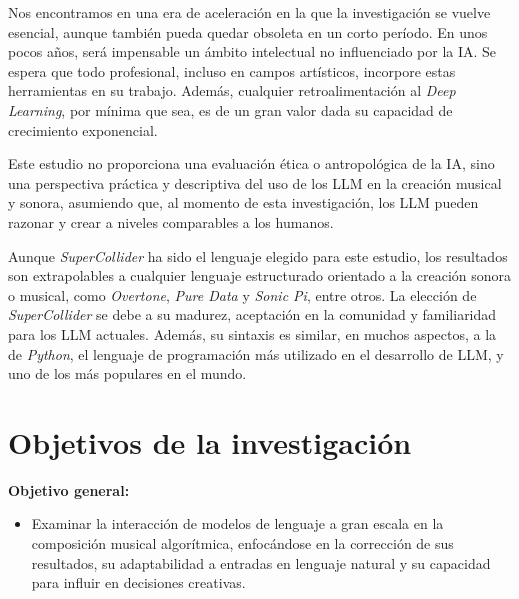 Nos encontramos en una era de aceleración en la que la investigación se vuelve esencial, aunque también pueda quedar obsoleta en un corto período. En unos pocos años, será impensable un ámbito intelectual no influenciado por la IA. Se espera que todo profesional, incluso en campos artísticos, incorpore estas herramientas en su trabajo. Además, cualquier retroalimentación al \textit{Deep Learning}, por mínima que sea, es de un gran valor dada su capacidad de crecimiento exponencial.

Este estudio no proporciona una evaluación ética o antropológica de la IA, sino una perspectiva práctica y descriptiva del uso de los LLM en la creación musical y sonora, asumiendo que, al momento de esta investigación, los LLM pueden razonar y crear a niveles comparables a los humanos.

Aunque \textit{SuperCollider} ha sido el lenguaje elegido para este estudio, los resultados son extrapolables a cualquier lenguaje estructurado orientado a la creación sonora o musical, como \textit{Overtone}, \textit{Pure Data} y \textit{Sonic Pi}, entre otros. La elección de \textit{SuperCollider} se debe a su madurez, aceptación en la comunidad y familiaridad para los LLM actuales. Además, su sintaxis es similar, en muchos aspectos, a la de \textit{Python}, el lenguaje de programación más utilizado en el desarrollo de LLM, y uno de los más populares en el mundo.


\section{Objetivos de la investigación}

\textbf{Objetivo general:}
\begin{itemize}
\item Examinar la interacción de modelos de lenguaje a gran escala en la composición musical algorítmica, enfocándose en la corrección de sus resultados, su adaptabilidad a entradas en lenguaje natural y su capacidad para influir en decisiones creativas.
\end{itemize}


